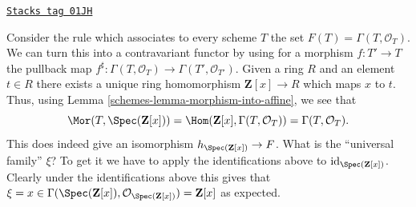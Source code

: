 \begin{example}
\label{schemes-example-global-sections}
\href{https://stacks.math.columbia.edu/tag/01JH}{\texttt{Stacks tag 01JH}}

Consider the rule which associates to every scheme $T$ the set
$F(T) = \Gamma(T, \mathcal{O}_T)$. We can turn this into a contravariant
functor by using for a morphism $f : T' \to T$ the pullback map
$f^\sharp : \Gamma(T, \mathcal{O}_T) \to \Gamma(T', \mathcal{O}_{T'})$.
Given a ring $R$ and an element $t \in R$ there exists a unique
ring homomorphism $\mathbf{Z}[x] \to R$ which maps $x$ to $t$.
Thus, using Lemma \ref{schemes-lemma-morphism-into-affine}, we see that
$$
\Mor(T, \Spec(\mathbf{Z}[x])) =
\Hom(\mathbf{Z}[x], \Gamma(T, \mathcal{O}_T)) =
\Gamma(T, \mathcal{O}_T).
$$
This does indeed
give an isomorphism $h_{\Spec(\mathbf{Z}[x])} \to F$.
What is the ``universal family'' $\xi$? To get it we have to
apply the identifications above to $\text{id}_{\Spec(\mathbf{Z}[x])}$.
Clearly under the identifications above this gives
that
$\xi = x \in \Gamma(\Spec(\mathbf{Z}[x]),
\mathcal{O}_{\Spec(\mathbf{Z}[x])}) = \mathbf{Z}[x]$
as expected.
\end{example}

